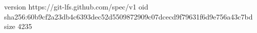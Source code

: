 version https://git-lfs.github.com/spec/v1
oid sha256:60b9cf2a23db4c6393dec52d5509872909c07dcecd9f79631f6d9e756a43c7bd
size 4235
